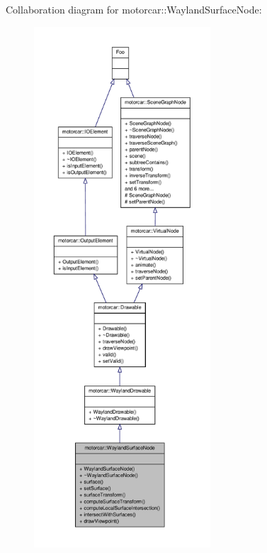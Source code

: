 Collaboration diagram for motorcar\-:\-:Wayland\-Surface\-Node\-:
\nopagebreak
\begin{figure}[H]
\begin{center}
\leavevmode
\includegraphics[height=550pt]{classmotorcar_1_1WaylandSurfaceNode__coll__graph}
\end{center}
\end{figure}
